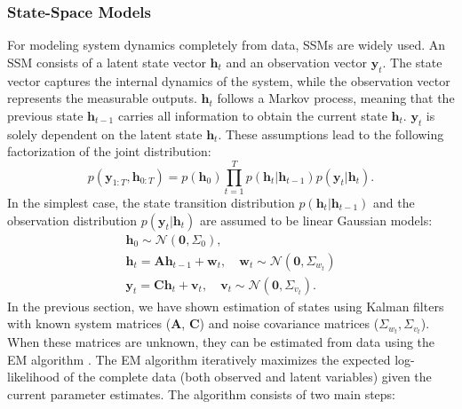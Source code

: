 \subsubsection{State-Space Models}
For modeling system dynamics completely from data, \acfp{SSM} \citep{Durbin2012} are widely used. An \ac{SSM} consists of a latent state vector $\boldsymbol{h}_t$ and an observation vector $\boldsymbol{y}_t$. The state vector captures the internal dynamics of the system, while the observation vector represents the measurable outputs. $\boldsymbol{h}_t$ follows a Markov process, meaning that the previous state $\boldsymbol{h}_{t-1}$ carries all information to obtain the current state $\boldsymbol{h}_t$. $\boldsymbol{y}_t$ is solely dependent on the latent state $\boldsymbol{h}_t$. These assumptions lead to the following factorization of the joint distribution:
\begin{equation}
    p(\boldsymbol{y}_{1:T}, \boldsymbol{h}_{0:T}) = p(\boldsymbol{h}_0) \prod_{t=1}^{T}p(\boldsymbol{h}_t|\boldsymbol{h}_{t-1})p(\boldsymbol{y}_t|\boldsymbol{h}_t).
\end{equation}
In the simplest case, the state transition distribution $p(\boldsymbol{h}_t|\boldsymbol{h}_{t-1})$ and the observation distribution $p(\boldsymbol{y}_t|\boldsymbol{h}_t)$ are assumed to be linear Gaussian models:
\begin{subequations}
    \begin{gather}
        \boldsymbol{h}_0\sim\mathcal{N}(\boldsymbol{0}, \Sigma_0), \\
        \boldsymbol{h}_t=\boldsymbol{A}\boldsymbol{h}_{t-1}+\boldsymbol{w}_t, \quad \boldsymbol{w}_t\sim\mathcal{N}(\boldsymbol{0},\Sigma_{w_t})\\
        \boldsymbol{y}_t=\boldsymbol{C}\boldsymbol{h}_t+\boldsymbol{v}_t, \quad \boldsymbol{v}_t\sim\mathcal{N}(\boldsymbol{0},\Sigma_{v_t}).
    \end{gather}
\end{subequations}
In the previous section, we have shown estimation of states using Kalman filters with known system matrices ($\boldsymbol{A}$, $\boldsymbol{C}$) and noise covariance matrices ($\Sigma_{w_t}, \Sigma_{v_t}$). When these matrices are unknown, they can be estimated from data using the \ac{EM} algorithm \citep{Dempster1977}. The \ac{EM} algorithm iteratively maximizes the expected log-likelihood of the complete data (both observed and latent variables) given the current parameter estimates. The algorithm consists of two main steps:
